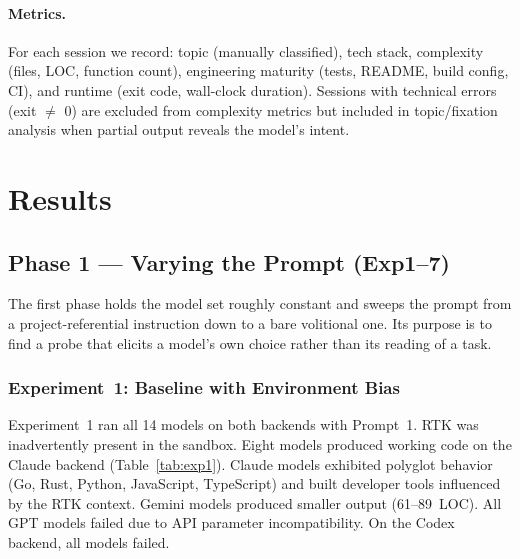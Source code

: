 \documentclass{article}
\begin{document}
\paragraph{Metrics.}
For each session we record: topic (manually classified), tech
stack, complexity (files, LOC, function count), engineering
maturity (tests, README, build config, CI), and runtime (exit
code, wall-clock duration). Sessions with technical errors (exit
$\neq$ 0) are excluded from complexity metrics but included in
topic/fixation analysis when partial output reveals the model's
intent.

\section{Results}
\label{sec:results}

\subsection{Phase 1 --- Varying the Prompt (Exp1--7)}
\label{sec:phase-prompt}

The first phase holds the model set roughly constant and sweeps
the prompt from a project-referential instruction down to a bare
volitional one. Its purpose is to find a probe that elicits a
model's own choice rather than its reading of a task.

\subsubsection{Experiment~1: Baseline with Environment Bias}

Experiment~1 ran all 14 models on both backends with Prompt~1.
RTK was inadvertently present in the sandbox.
Eight models produced working code on the Claude backend
(Table~\ref{tab:exp1}). Claude models exhibited polyglot behavior
(Go, Rust, Python, JavaScript, TypeScript) and built developer
tools influenced by the RTK context. Gemini models produced
smaller output (61--89~LOC). All GPT models failed due to API
parameter incompatibility. On the Codex backend, all models
failed.
\end{document}
